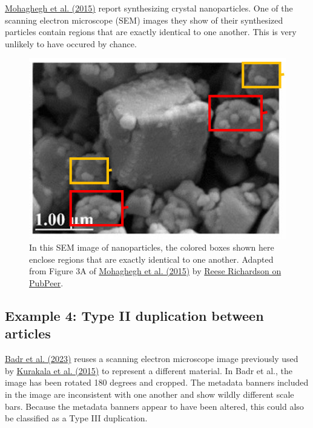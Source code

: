 \documentclass[letterpaper, 12pt]{article}
\begin{document}
\href{https://doi.org/10.1007/s10853-015-9003-3}{Mohaghegh et al. (2015)} report synthesizing crystal nanoparticles. One of the scanning electron microscope (SEM) images they show of their synthesized particles contain regions that are exactly identical to one another. This is very unlikely to have occured by chance.

\begin{figure}[h!tbp]
    \centering
    \includegraphics[width=\textwidth]{img/image_duplication/image-1741643734642.jpg}
    \caption*{In this SEM image of nanoparticles, the colored boxes shown here enclose regions that are exactly identical to one another. Adapted from Figure 3A of \href{https://doi.org/10.1007/s10853-015-9003-3}{Mohaghegh et al. (2015)} by \href{https://pubpeer.com/publications/7BE7C2A93C385F700F1C6B5BC90294\#1}{Reese Richardson on PubPeer}.}
\end{figure}

\pagebreak

\subsection*{Example 4: Type II duplication between articles}

\href{https://doi.org/10.3390/ph16070925}{Badr et al. (2023)} reuses a scanning electron microscope image previously used by \href{https://doi.org/10.2147/ijn.s77731}{Kurakala et al. (2015)} to represent a different material. In Badr et al., the image has been rotated 180 degrees and cropped. The metadata banners included in the image are inconsistent with one another and show wildly different scale bars. Because the metadata banners appear to have been altered, this could also be classified as a Type III duplication.
\end{document}
